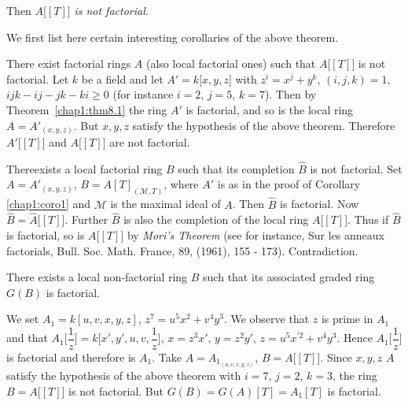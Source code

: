     Then $A \big[[T]\big]$ \textit{is not factorial}.
    
    We first list here certain interesting corollaries of the above
    theorem. 
    
\begin{corollary}\label{chap1:coro1} %
There exist factorial rings $A$ (also local factorial ones) such that
$A\big[[T]\big]$ is not factorial. Let $k$ be a field and let $A' =
k \big[x, y, z \big]$ with $z^i = x^j + y^k$, $(i, j, k) = 1$, $ijk - ij
- jk -ki \geq 0 $ (for instance $i = 2$, $j = 5$, $k = 7$). Then by
Theorem~\ref{chap1:thm8.1} the ring $A'$ is factorial, and so is the
local ring $A= 
A'_{(x, y, z)}$. But $x, y, z$ satisfy the hypothesis of the above
theorem. Therefore $A' \big[[T]\big]$ and $A \big[[T]\big]$ are not
factorial. 
\end{corollary} 
   
\begin{corollary}\label{chap1:coro2} %
There\pageoriginale exists a local factorial ring $B$ such that its
completion 
$\hat{B}$ is not factorial. Set $A = A'_{(x, y, z)}$, $B = A
[T]_{({\mathscr{M}}, T)}$, where $A'$ is as in the proof of Corollary
\ref{chap1:coro1} 
and $\mathscr{M}$ is the maximal ideal of $A$. Then $\hat{B}$ is
factorial. Now $\hat{B} = \hat{A} \big[[T]\big]$. Further $\hat{B}$
is also the completion of the local ring $A \big[[T]\big]$. Thus if
$\hat{B}$ is factorial, so is $A \big[[T]\big]$ by \textit{Mori's
  Theorem} (see for instance, Sur les anneaux factorials,
Bull. Soc. Math. France, 89, (1961), 155 - 173). Contradiction. 
\end{corollary} 
  
\begin{corollary} %
There exists a local non-factorial ring $B$ such that its associated
graded ring $G(B)$ is factorial. 
\end{corollary}    
  
\noindent
We set $A_1 = k [ u, v, x, y, z]$, $z^7 = u^5 x^2 + v^4 y^3$. We observe
that $z$ is prime in $A_1$ and that $A_1 \big[\dfrac{1}{z}\big] = k
\big[x', y', u, v, \dfrac{1}{z} \big]$, $x = z^3 x'$,  $y = z^2y'$, $z =
u^5 x^{' 2}+ v^4y^3$. Hence $A_1 \big[ \dfrac{1}{z} \big]$ is
factorial and therefore  is $A_1$. Take $A = A_{1_{(u, v, x, y, z)}}$, $B
= A \big[[T]\big]$. Since $x, y, z$  $A$ satisfy the hypothesis of
the above theorem with $i = 7$, $j = 2$, $k = 3$, the ring  $B = A
\big[[T]\big]$ is not factorial. But $G(B) = G (A) [T] = A_1 [T]$ is
factorial.  

